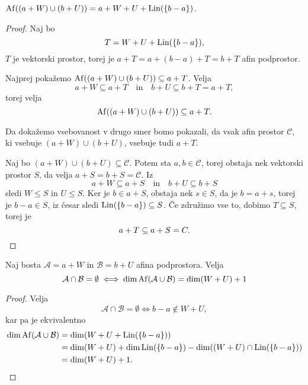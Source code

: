 \begin{lema}
    $\operatorname{Af} ((a + W) \cup (b + U)) = a + W + U + \operatorname{Lin} (\left\{b - a\right\})$.
\end{lema}

\begin{proof}
    Naj bo 
    \[
    T = W + U + \operatorname{Lin} (\left\{b - a\right\}),
    \]
    $T$ je vektorski prostor, torej je $a + T = a + (b - a) + T = b + T$ afin podprostor.

    Najprej pokažemo $\operatorname{Af} ((a + W) \cup (b + U)) \subseteq a + T$. Velja
    \[
        a + W \subseteq a + T
        \quad \text{in} \quad
        b + U \subseteq b + T = a + T,
    \]
    torej velja
    \[
    \operatorname{Af} ((a + W) \cup (b + U)) \subseteq a + T.
    \]

    Da dokažemo vsebovanost v drugo smer bomo pokazali, da vsak afin prostor $\mathcal{C}$, ki vsebuje $(a + W) \cup (b + U)$, vsebuje tudi $a + T$.

    Naj bo $(a + W) \cup (b + U) \subseteq \mathcal{C}$. Potem sta $a, b \in \mathcal{C}$, torej obstaja nek vektorski prostor $S$, da velja $a + S = b + S = \mathcal{C}$. Iz
    \[
        a + W \subseteq a + S
        \quad \text{in} \quad
        b + U \subseteq b + S
    \]
    sledi $W \leq S$ in $U \leq S$. Ker je $b \in a + S$, obstaja nek $s \in S$, da je $b = a + s$, torej je $b - a \in S$, iz česar sledi $\operatorname{Lin} (\left\{b - a\right\}) \subseteq S$.
    Če združimo vse to, dobimo $T \subseteq S$, torej je
    \[
    a + T \subseteq a + S = C. \qedhere
    \] 
\end{proof}

\begin{trditev}
    Naj bosta $\mathcal{A} = a + W$ in $\mathcal{B} = b + U$ afina podprostora. Velja
    \[
    \mathcal{A} \cap \mathcal{B} = \emptyset \iff \dim \operatorname{Af} ( \mathcal{A} \cup \mathcal{B} ) = \dim (W + U) + 1
    \]
\end{trditev}

\begin{proof}
	Velja
    \[
        \mathcal{A} \cap \mathcal{B} = \emptyset \iff b - a \notin W + U,
    \]
    kar pa je ekvivalentno
    \begin{align*}
        \dim \operatorname{Af} ( \mathcal{A} \cup \mathcal{B} ) &= \dim (W + U + \operatorname{Lin} (\left\{b-a\right\})) \\
        &= \dim (W + U) + \dim \operatorname{Lin} (\left\{b-a\right\}) - \dim ((W + U) \cap \operatorname{Lin} (\left\{b-a\right\})) \\
        &= \dim (W + U) + 1. \qedhere
    \end{align*}
\end{proof}

